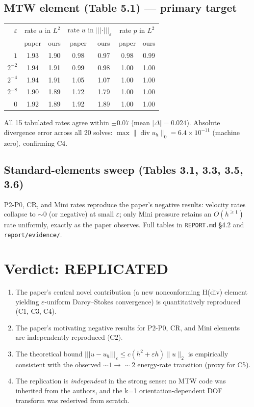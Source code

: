 \documentclass[11pt]{article}
\begin{document}
\subsection{MTW element (Table 5.1) --- primary target}
\begin{center}\small
\begin{tabular}{r|cc|cc|cc}
\toprule
$\varepsilon$ &
 \multicolumn{2}{c|}{rate $u$ in $L^2$} &
 \multicolumn{2}{c|}{rate $u$ in $|||\cdot|||_\varepsilon$} &
 \multicolumn{2}{c}{rate $p$ in $L^2$}\\
 & paper & ours & paper & ours & paper & ours\\
\midrule
$1$      & 1.93 & 1.90 & 0.98 & 0.97 & 0.98 & 0.99\\
$2^{-2}$ & 1.94 & 1.91 & 0.99 & 0.98 & 1.00 & 1.00\\
$2^{-4}$ & 1.94 & 1.91 & 1.05 & 1.07 & 1.00 & 1.00\\
$2^{-8}$ & 1.90 & 1.89 & 1.72 & 1.79 & 1.00 & 1.00\\
$0$      & 1.92 & 1.89 & 1.92 & 1.89 & 1.00 & 1.00\\
\bottomrule
\end{tabular}
\end{center}
All 15 tabulated rates agree within $\pm 0.07$ (mean $|\Delta|=0.024$).
Absolute divergence error across all 20 solves: $\max\|\operatorname{div}
u_h\|_0=6.4\times 10^{-11}$ (machine zero), confirming C4.

\subsection{Standard-elements sweep (Tables 3.1, 3.3, 3.5, 3.6)}
P2-P0, CR, and Mini rates reproduce the paper's negative results:
velocity rates collapse to $\sim 0$ (or negative) at small
$\varepsilon$; only Mini pressure retains an $O(h^{\geq 1})$ rate
uniformly, exactly as the paper observes.  Full tables in
\texttt{REPORT.md} \S4.2 and \texttt{report/evidence/}.

\section{Verdict: REPLICATED}
\begin{enumerate}
\item The paper's central novel contribution (a new nonconforming
H(div) element yielding $\varepsilon$-uniform Darcy--Stokes
convergence) is quantitatively reproduced (C1, C3, C4).
\item The paper's motivating negative results for P2-P0, CR, and Mini
elements are independently reproduced (C2).
\item The theoretical bound
$|||u-u_h|||_\varepsilon\le c(h^2+\varepsilon h)\|u\|_2$ is
empirically consistent with the observed $\sim 1\to\sim 2$ energy-rate
transition (proxy for C5).
\item The replication is \emph{independent} in the strong sense: no
MTW code was inherited from the authors, and the k=1
orientation-dependent DOF transform was rederived from scratch.
\end{enumerate}
\end{document}
